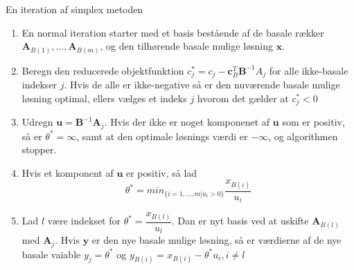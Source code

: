 En iteration af simplex metoden
\begin{enumerate}
\item En normal iteration starter med et basis bestående af de basale rækker $\textbf{A}_{B(1)},\ldots,\textbf{A}_{B(m)}$, og den tilhørende basale mulige løsning $\textbf{x}$.
\item Beregn den reducerede objektfunktion $c_j^* = c_j - \mathbf{c}_B^T \textbf{B}^{-1}A_j$ for alle ikke-basale indekser $j$. Hvis de alle er ikke-negative så er den nuværende basale mulige løsning optimal, ellers vælges et indeks $j$ hvorom det gælder at $c^*_j<0$
\item Udregn $\textbf{u}=\textbf{B}^{-1}\textbf{A}_j$. Hvis der ikke er noget komponenet af $\textbf{u}$ som er positiv, så er $\theta ^*=\infty$, samt at den optimale løsnings værdi er $-\infty$, og algorithmen stopper.
\item Hvis et komponent af $\textbf{u}$ er positiv, så lad 
$$\theta^*= min_{ \{i=1,\ldots,m|u_i>0 \} }        \dfrac{x_{B(i)}}{u_i}$$
\item Lad $l$ være indekset for $\theta^*=  \dfrac{x_{B(l)}}{u_l}$. Dan er nyt basis ved at uskifte $\textbf{A}_{B(l)}$ med $\textbf{A}_j$. Hvis $\textbf{y}$ er den nye basale mulige løsning, så er værdierne af de nye basale vaiable $y_j=\theta^*$ og $y_{B(i)}=x_{B(i)}-\theta^*u_i,i\neq l$

\end{enumerate}


